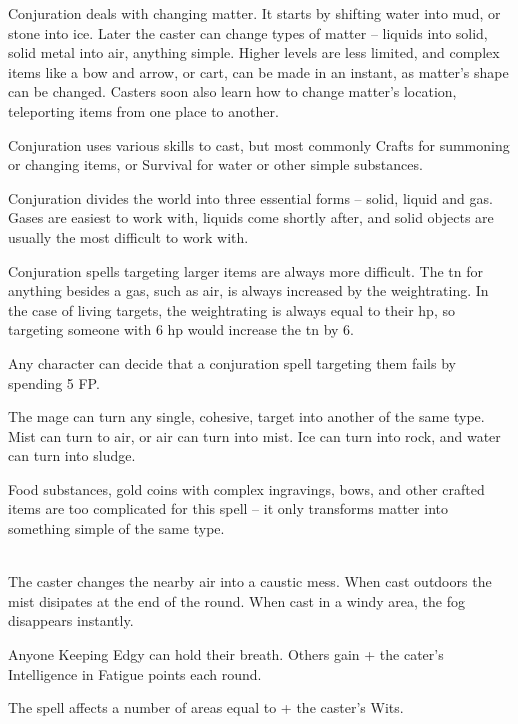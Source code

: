 
\begin{multicols}{2}

Conjuration deals with changing matter.
It starts by shifting water into mud, or stone into ice.  Later the caster can change types of matter -- liquids into solid, solid metal into air, anything simple.
Higher levels are less limited, and complex items like a bow and arrow, or cart, can be made in an instant, as matter's shape can be changed.  Casters soon also learn how to change matter's location, teleporting items from one place to another.

Conjuration uses various skills to cast, but most commonly Crafts for summoning or changing items, or Survival for water or other simple substances.

Conjuration divides the world into three essential forms -- solid, liquid and gas.  Gases are easiest to work with, liquids come shortly after, and solid objects are usually the most difficult to work with.

Conjuration spells targeting larger items are always more difficult.  The \gls{tn} for anything besides a gas, such as air, is always increased by the \gls{weightrating}.
In the case of living targets, the \gls{weightrating} is always equal to their \gls{hp}, so targeting someone with 6 \gls{hp} would increase the \gls{tn} by 6.

Any character can decide that a conjuration spell targeting them fails by spending 5 FP.

\spelllevel

The mage can turn any single, cohesive, target into another of the same type.  Mist can turn to air, or air can turn into mist.
Ice can turn into rock, and water can turn into sludge.

Food substances, gold coins with complex ingravings, bows, and other crafted items are too complicated for this spell -- it only transforms matter into something simple of the same type.

\\
The caster changes the nearby air into a caustic mess.  When cast outdoors the mist disipates at the end of the \gls{round}.  When cast in a windy area, the fog disappears instantly.

Anyone Keeping Edgy can hold their breath.  Others gain  + the cater's Intelligence in Fatigue points each \gls{round}.

The spell affects a number of areas equal to  + the caster's Wits.


\end{multicols}
